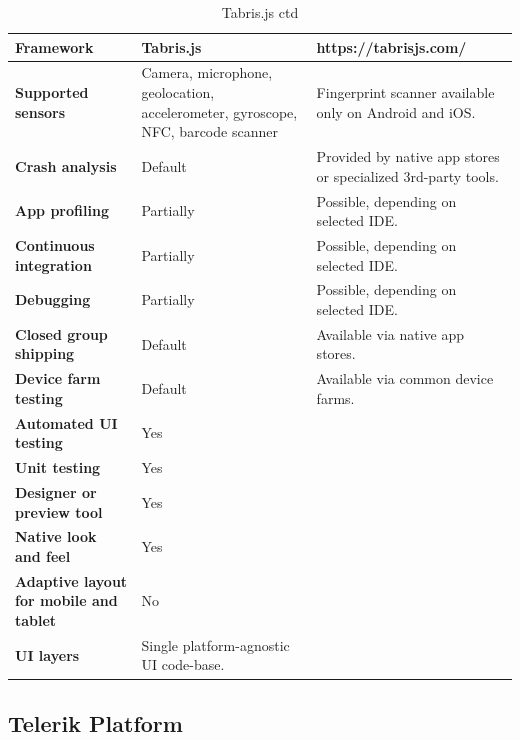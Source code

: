 \documentclass[english,master,public,dept460,male,cpdeclaration,oneside]{diploma}
\begin{document}
\begin{table}[!h]
	\centering
	\caption{Tabris.js ctd}
	\begin{tabular}{p{} | p{} | p{}}
		\toprule		
		\textbf{Framework} & \textbf{Tabris.js} & https://tabrisjs.com/ \\
		\midrule
		\textbf{Supported sensors} & Camera, microphone, geolocation, accelerometer, gyroscope, NFC, barcode scanner & Fingerprint scanner available only on Android and iOS. \\			
		\midrule
		\textbf{Crash analysis} & Default & Provided by native app stores or specialized 3rd-party tools. \\			
		\midrule
		\textbf{App profiling} & Partially & Possible, depending on selected IDE. \\			
		\midrule
		\textbf{Continuous integration} & Partially & Possible, depending on selected IDE. \\			
		\midrule
		\textbf{Debugging} & Partially & Possible, depending on selected IDE. \\			
		\midrule
		\textbf{Closed group shipping} & Default & Available via native app stores. \\			
		\midrule
		\textbf{Device farm testing} & Default & Available via common device farms. \\			
		\midrule
		\textbf{Automated UI testing} & Yes & \\			
		\midrule
		\textbf{Unit testing} & Yes & \\			
		\midrule
		\textbf{Designer or preview tool} & Yes & \\			
		\midrule
		\textbf{Native look and feel} & Yes & \\			
		\midrule
		\textbf{Adaptive layout for mobile and tablet} & No & \\			
		\midrule		
		\textbf{UI layers} & Single platform-agnostic UI code-base. & \\			
		\midrule
	\end{tabular}
\end{table}

\clearpage
\subsection{Telerik Platform}
\end{document}
